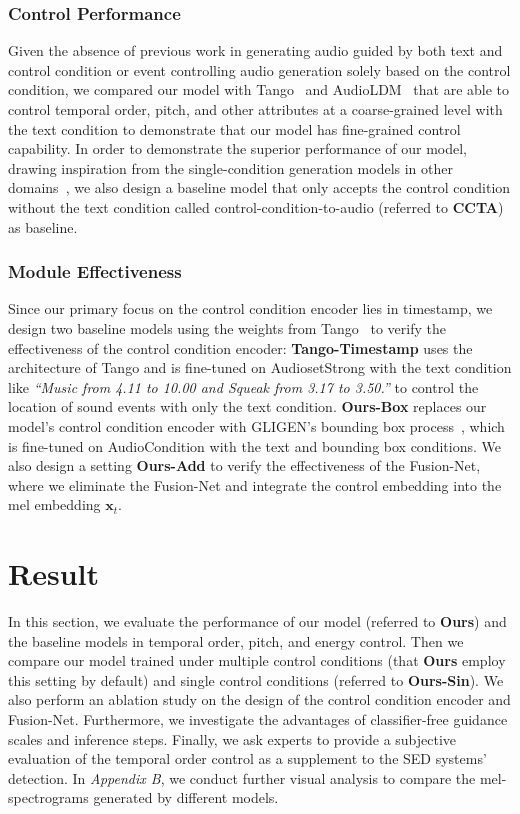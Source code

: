 \documentclass[letterpaper]{article}
\begin{document}
\subsubsection{Control Performance} Given the absence of previous work in generating audio guided by both text and control condition or event controlling audio generation solely based on the control condition, we compared our model with Tango~\cite{ghosal2023tango} and AudioLDM~\cite{liu2023audioldm} that are able to control temporal order, pitch, and other attributes at a coarse-grained level with the text condition to demonstrate that our model has fine-grained control capability. In order to demonstrate the superior performance of our model, drawing inspiration from the single-condition generation models in other domains~\cite{jahn2021highresolutioncs,li2023blip2,radford2020gpt3}, we also design a baseline model that only accepts the control condition without the text condition called control-condition-to-audio (referred to \textbf{CCTA}) as baseline.

\subsubsection{Module Effectiveness} Since our primary focus on the control condition encoder lies in timestamp, we design two baseline models using the weights from Tango~\cite{ghosal2023tango} to verify the effectiveness of the control condition encoder: \textbf{Tango-Timestamp} uses the architecture of Tango and is fine-tuned on AudiosetStrong with the text condition like \textit{``Music from 4.11 to 10.00 and Squeak from 3.17 to 3.50.''} to control the location of sound events with only the text condition. \textbf{Ours-Box} replaces our model's control condition encoder with GLIGEN's bounding box process~\cite{li2023gligen}, which is fine-tuned on AudioCondition with the text and bounding box conditions. We also design a setting \textbf{Ours-Add} to verify the effectiveness of the Fusion-Net, where we eliminate the Fusion-Net and integrate the control embedding into the mel embedding $\mathbf{x}_{t}$.

\section{Result}

In this section, we evaluate the performance of our model (referred to \textbf{Ours}) and the baseline models in temporal order, pitch, and energy control. Then we compare our model trained under multiple control conditions (that \textbf{Ours} employ this setting by default) and single control conditions (referred to \textbf{Ours-Sin}). We also perform an ablation study on the design of the control condition encoder and Fusion-Net. Furthermore, we investigate the advantages of classifier-free guidance scales and inference steps. Finally, we ask experts to provide a subjective evaluation of the temporal order control as a supplement to the SED systems' detection. In \textit{Appendix B}, we conduct further visual analysis to compare the mel-spectrograms generated by different models.
\end{document}
